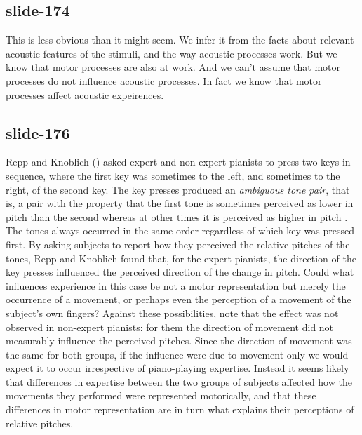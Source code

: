 \documentclass[12pt,\papersize]{extarticle}
\begin{document}
\subsection{slide-174}
This is less obvious than it might seem.
We infer it from the facts about relevant acoustic features of the stimuli, and the
way acoustic processes work.
But we know that motor processes are also at work.
And we can’t assume that motor processes do not influence acoustic processes.
In fact we know that motor processes affect acoustic expeirences.

\subsection{slide-176}
Repp and Knoblich (\citeyear{repp:2007_action}) asked expert and non-expert pianists to press two keys in sequence, where the first key was sometimes to the left, and sometimes to the right, of the second key.  The key presses produced an \emph{ambiguous tone pair}, that is, a pair with the property that the first tone is sometimes perceived as lower in pitch than the second whereas at other times it is perceived  as higher in pitch \citep{deutsch:1987_tritone}.
The tones always occurred in the same order regardless of which key was pressed first.  By asking subjects to report how they perceived the relative pitches of the tones, Repp and Knoblich found that, for the expert pianists, the direction of the key presses influenced the perceived direction of the change in pitch. Could what influences experience in this case be not a motor representation but merely the occurrence of a movement, or perhaps even the perception of a movement of the subject's own fingers? Against these possibilities, note that the effect was not observed in non-expert pianists: for them the direction of movement did not measurably influence the perceived pitches. Since the direction of movement was the same for both groups, if the influence were due to movement only we would expect it to occur irrespective of piano-playing expertise. Instead it seems likely that differences in expertise between the two groups of subjects affected how the movements they performed were represented motorically, and that these differences in motor representation are in turn what explains their perceptions of relative pitches.
\end{document}
